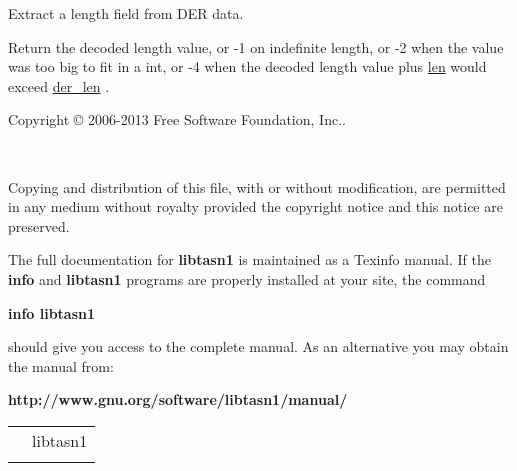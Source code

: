 \documentclass[]{article}
\let\realtextbf=\textbf
\renewcommand{\textbf}[1]{\textcolor{boldcolor}{\realtextbf{#1}}}
\renewcommand{\emph}[1]{\underline{#1}}
\begin{document}

Extract a length field from DER data.


Return the decoded length value, or -1 on indefinite length, or -2 when
the value was too big to fit in a int, or -4 when the decoded length
value plus \emph{len} would exceed \emph{der\_len} .


Copyright © 2006-2013 Free Software Foundation, Inc..

~

Copying and distribution of this file, with or without modification, are
permitted in any medium without royalty provided the copyright notice
and this notice are preserved.


The full documentation for \textbf{libtasn1} is maintained as a Texinfo
manual. If the \textbf{info} and \textbf{libtasn1} programs are properly
installed at your site, the command

\begin{description}
\itemsep1pt\parskip0pt
\item[]
\textbf{info libtasn1}
\end{description}

should give you access to the complete manual. As an alternative you may
obtain the manual from:

\begin{description}
\itemsep1pt\parskip0pt
\item[]
\textbf{http://www.gnu.org/software/libtasn1/manual/}
\end{description}

\begin{longtable}[c]{@{}ll@{}}
\toprule\addlinespace
3.4 & libtasn1
\\\addlinespace
\bottomrule
\end{longtable}
\end{document}
